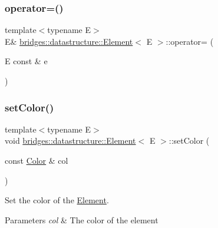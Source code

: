 \subsubsection{\texorpdfstring{operator=()}{operator=()}\hspace{0.1cm}{\footnotesize\ttfamily [2/2]}}
{\footnotesize\ttfamily template$<$typename E$>$ \\
E\& \hyperlink{classbridges_1_1datastructure_1_1_element}{bridges\+::datastructure\+::\+Element}$<$ E $>$\+::operator= (\begin{DoxyParamCaption}\item[{E const \&}]{e }\end{DoxyParamCaption})\hspace{0.3cm}{\ttfamily [inline]}}

\mbox{\label{classbridges_1_1datastructure_1_1_element_a17d75aae50a48b3404f3c6811c62ae1c}} 
\subsubsection{\texorpdfstring{set\+Color()}{setColor()}\hspace{0.1cm}{\footnotesize\ttfamily [1/2]}}
{\footnotesize\ttfamily template$<$typename E$>$ \\
void \hyperlink{classbridges_1_1datastructure_1_1_element}{bridges\+::datastructure\+::\+Element}$<$ E $>$\+::set\+Color (\begin{DoxyParamCaption}\item[{const \hyperlink{classbridges_1_1datastructure_1_1_color}{Color} \&}]{col }\end{DoxyParamCaption})\hspace{0.3cm}{\ttfamily [inline]}}



Set the color of the \hyperlink{classbridges_1_1datastructure_1_1_element}{Element}. 


\begin{DoxyParams}{Parameters}
{\em col} & The color of the element \\
\hline
\end{DoxyParams}
\mbox{\label{classbridges_1_1datastructure_1_1_element_a3792c8d514f4d644d739c6124f26bcbf}} 
